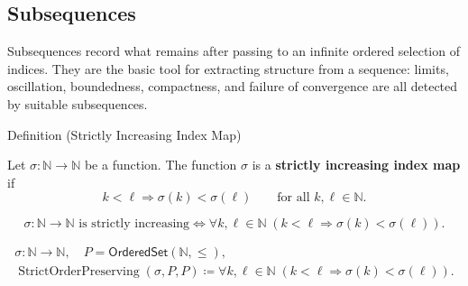 \subsection*{Subsequences}

\begin{exposition}
Subsequences record what remains after passing to an infinite ordered selection
of indices. They are the basic tool for extracting structure from a sequence:
limits, oscillation, boundedness, compactness, and failure of convergence are
all detected by suitable subsequences.
\end{exposition}


\begin{definitionbox}{Definition (Strictly Increasing Index Map)}
\begin{definition}
\label{def:strictly-increasing-index-map}
Let $\sigma:\mathbb{N}\to\mathbb{N}$ be a function. The function $\sigma$
is a \textbf{strictly increasing index map} if
\[
  k<\ell \Longrightarrow \sigma(k)<\sigma(\ell)
  \qquad
  \text{for all } k,\ell\in\mathbb{N}.
\]
\end{definition}
\end{definitionbox}

\begin{remark*}
\[
\sigma:\mathbb{N}\to\mathbb{N}\text{ is strictly increasing}
\Longleftrightarrow
\forall k,\ell\in\mathbb{N}\;(k<\ell\Longrightarrow \sigma(k)<\sigma(\ell)).
\]
\end{remark*}

\begin{remark*}
\[
\begin{gathered}
\sigma\colon\mathbb{N}\to\mathbb{N},\quad
P=\mathsf{OrderedSet}(\mathbb{N},\leq),\\
\operatorname{StrictOrderPreserving}(\sigma,P,P)
\coloneqq
\forall k,\ell\in\mathbb{N}\;(k<\ell\Longrightarrow \sigma(k)<\sigma(\ell)).
\end{gathered}
\]
\end{remark*}

